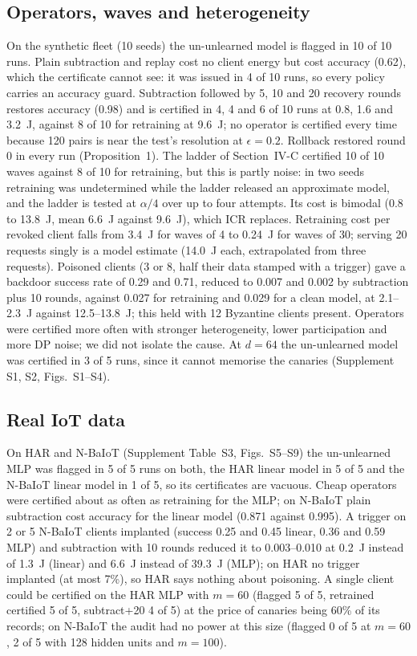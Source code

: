 \documentclass[journal]{IEEEtran}
\begin{document}
\subsection{Operators, waves and heterogeneity}
On the synthetic fleet (10 seeds) the un-unlearned model is flagged in 10 of 10 runs. Plain subtraction and replay cost no client energy but cost accuracy (0.62), which the certificate cannot see: it was issued in 4 of 10 runs, so every policy carries an accuracy guard. Subtraction followed by 5, 10 and 20 recovery rounds restores accuracy (0.98) and is certified in 4, 4 and 6 of 10 runs at 0.8, 1.6 and 3.2~J, against 8 of 10 for retraining at 9.6~J; no operator is certified every time because 120 pairs is near the test's resolution at $\epsilon=0.2$. Rollback restored round 0 in every run (Proposition~1). The ladder of Section~IV-C certified 10 of 10 waves against 8 of 10 for retraining, but this is partly noise: in two seeds retraining was undetermined while the ladder released an approximate model, and the ladder is tested at $\alpha/4$ over up to four attempts. Its cost is bimodal (0.8 to 13.8~J, mean 6.6~J against 9.6~J), which ICR replaces. Retraining cost per revoked client falls from 3.4~J for waves of 4 to 0.24~J for waves of 30; serving 20 requests singly is a model estimate (14.0~J each, extrapolated from three requests). Poisoned clients (3 or 8, half their data stamped with a trigger) gave a backdoor success rate of 0.29 and 0.71, reduced to 0.007 and 0.002 by subtraction plus 10 rounds, against 0.027 for retraining and 0.029 for a clean model, at 2.1--2.3~J against 12.5--13.8~J; this held with 12 Byzantine clients present. Operators were certified more often with stronger heterogeneity, lower participation and more DP noise; we did not isolate the cause. At $d=64$ the un-unlearned model was certified in 3 of 5 runs, since it cannot memorise the canaries (Supplement S1, S2, Figs.~S1--S4).

\subsection{Real IoT data}
On HAR and N-BaIoT (Supplement Table~S3, Figs.~S5--S9) the un-unlearned MLP was flagged in 5 of 5 runs on both, the HAR linear model in 5 of 5 and the N-BaIoT linear model in 1 of 5, so its certificates are vacuous. Cheap operators were certified about as often as retraining for the MLP; on N-BaIoT plain subtraction cost accuracy for the linear model (0.871 against 0.995). A trigger on 2 or 5 N-BaIoT clients implanted (success 0.25 and 0.45 linear, 0.36 and 0.59 MLP) and subtraction with 10 rounds reduced it to 0.003--0.010 at 0.2~J instead of 1.3~J (linear) and 6.6~J instead of 39.3~J (MLP); on HAR no trigger implanted (at most 7\%), so HAR says nothing about poisoning. A single client could be certified on the HAR MLP with $m=60$ (flagged 5 of 5, retrained certified 5 of 5, subtract+20 4 of 5) at the price of canaries being 60\% of its records; on N-BaIoT the audit had no power at this size (flagged 0 of 5 at $m=60$, 2 of 5 with 128 hidden units and $m=100$).
\end{document}
